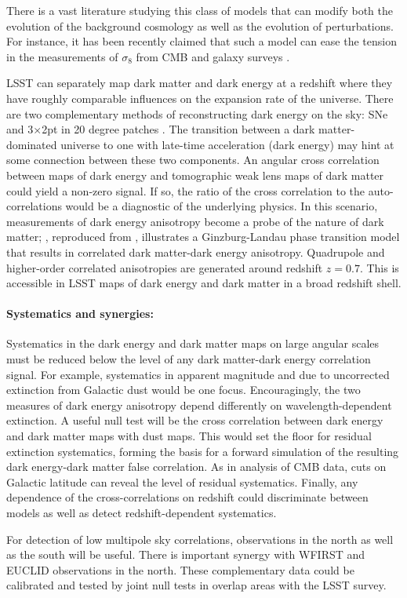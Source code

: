 There is a vast literature studying this class of models that can modify both the evolution of the 
background cosmology as well as the evolution of perturbations. For instance, it has been recently claimed
that such a model can ease the tension in the measurements of $\sigma_8$ from CMB and galaxy surveys 
\citep{Barros:2018efl}.

LSST can separately map dark matter and dark energy at a redshift where they have roughly comparable influences on the expansion rate of the universe. 
There are two complementary methods of reconstructing dark energy on the sky: SNe and 3$\times$2pt in 20 degree patches \citep[Figure 15.9 in ][]{0912.0201}.
The transition between a dark matter-dominated universe to one with late-time acceleration (dark energy) may hint at some connection between these two components. 
An angular cross correlation between maps of dark energy and tomographic weak lens maps of dark matter could yield a non-zero signal.  
If so, the ratio of the cross correlation to the auto-correlations would be a diagnostic of the underlying physics. 
In this scenario, measurements of dark energy anisotropy become a probe of the nature of dark matter; , reproduced from \cite{1810.11007}, illustrates a Ginzburg-Landau phase transition model that results in correlated dark matter-dark energy anisotropy. 
Quadrupole and higher-order correlated anisotropies are generated around redshift $z=0.7$.  
This is accessible in LSST maps of dark energy and dark matter in a broad redshift shell.

\paragraph{Systematics and synergies:}
Systematics in the dark energy and dark matter maps on large angular scales must be reduced below the level of any dark matter-dark energy correlation signal.  
For example, systematics in apparent magnitude and \photoz due to uncorrected extinction from Galactic dust would be one focus. 
Encouragingly, the two measures of dark energy anisotropy depend differently on wavelength-dependent extinction. 
A useful null test will be the cross correlation between dark energy and dark matter maps with dust maps.  
This would set the floor for residual extinction systematics, forming the basis for a forward simulation of the resulting dark energy-dark matter false correlation. 
As in analysis of CMB data, cuts on Galactic latitude can reveal the level of residual systematics. 
Finally, any dependence of the cross-correlations on redshift could discriminate between models as well as detect redshift-dependent systematics.

For detection of low multipole sky correlations, observations in the north as well as the south will be useful.
There is important synergy with WFIRST and EUCLID observations in the north.  
These complementary data could be calibrated and tested by joint null tests in overlap areas with the LSST survey.
